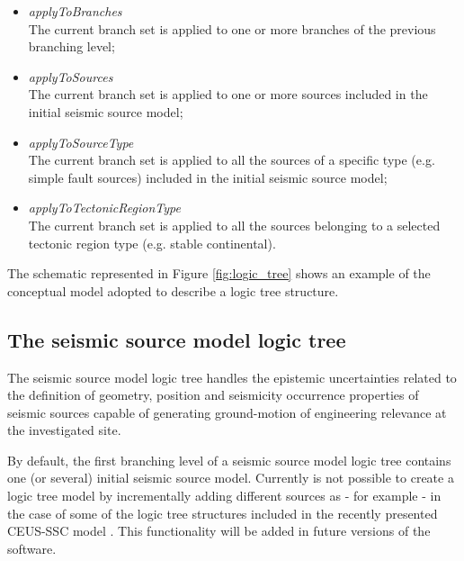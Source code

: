 \begin{itemize}
    \item \emph{applyToBranches} \hfill \\
        The current branch set is applied to one 
        or more branches of the previous branching level;
    \item \emph{applyToSources} \hfill \\
        The current branch set is applied to 
        one or more sources included in the initial seismic source model;
    \item \emph{applyToSourceType} \hfill \\
        The current branch set is applied to 
        all the sources of a specific type (e.g. simple fault sources) 
        included in the initial seismic source model;
    \item \emph{applyToTectonicRegionType} \hfill \\
        The current branch set is applied to all the sources belonging 
        to a selected tectonic region type (e.g. stable continental).
\end{itemize}
%
The schematic represented in Figure \ref{fig:logic_tree} shows an example of 
the conceptual model adopted to describe a logic tree structure. 
%
\subsection{The seismic source model logic tree}
The seismic source model logic tree handles the epistemic uncertainties
related to the definition of geometry, position and seismicity occurrence 
properties of seismic sources capable of generating ground-motion of 
engineering relevance at the investigated site. 

By default, the first branching level of a seismic source model logic tree 
contains one (or several) initial seismic source model. 
%
Currently is not possible to create a logic tree model by 
incrementally adding different sources as - for example - in the case of 
some of the logic tree structures included in the recently presented 
CEUS-SSC model \parencite{ceus2012}. 
%
This functionality will be added in future versions of the software.
%
